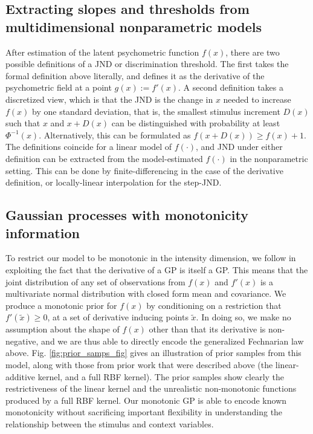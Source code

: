 \documentclass[../main.tex]{subfiles}
\begin{document}
\subsection{Extracting slopes and thresholds from multidimensional nonparametric models}
After estimation of the latent psychometric function $f(x)$, there are two possible definitions of a JND or
discrimination threshold. The first takes the formal definition above literally, and defines it as the derivative of the psychometric field at a point $g(x) := f'(x)$. A second definition takes a discretized view, which is that the JND is the change in $x$ needed to increase $f(x)$ by one standard deviation, that is, the smallest stimulus increment $D(x)$ such that $x$ and $x+ D(x)$ can be distinguished with probability at least $\Phi^{-1}(x)$. Alternatively, this can be formulated as $f(x+ D(x))  \ge f(x)+ 1$. The definitions coincide for a linear model of $f(\cdot)$, and JND under either definition can be extracted from the model-estimated $f(\cdot)$ in the nonparametric setting. This can be done by finite-differencing in the case of the derivative definition, or locally-linear interpolation for the step-JND.

\subsection{Gaussian processes with monotonicity information}
To restrict our model to be monotonic in the intensity dimension, we follow \citet{Riihimaki2010} in exploiting the fact that the derivative of a GP is itself a GP. This means that the joint distribution of any set of observations from $f(x)$ and $f'(x)$ is a multivariate normal distribution with closed form mean and covariance. We produce a monotonic prior for $f(x)$ by conditioning on a restriction that $f'(\tilde{x}) \geq 0$, at a set of derivative inducing points $\tilde{x}$. In doing so, we make no assumption about the shape of $f(x)$ other than that its derivative is non-negative, and we are thus able to directly encode the generalized Fechnarian law above. Fig. \ref{fig:prior_samps_fig} gives an illustration of prior samples from this model, along with those from prior work that were described above (the linear-additive kernel, and a full RBF kernel). The prior samples show clearly the restrictiveness of the linear kernel and the unrealistic non-monotonic functions produced by a full RBF kernel. Our monotonic GP is able to encode known monotonicity without sacrificing important flexibility in understanding the relationship between the stimulus and context variables.
\end{document}
